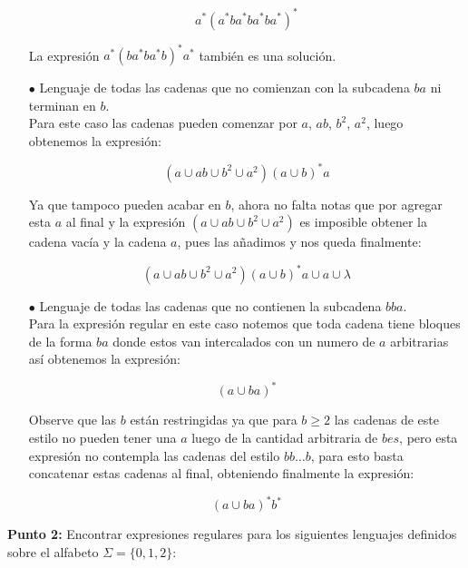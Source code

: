 \begin{itemize}
    $$a^*(a^*ba^*ba^*ba^*)^*$$

    La expresión $a^*(ba^*ba^*b)^*a^*$ también es una solución.

    \item[$\bullet$] Lenguaje de todas las cadenas que no comienzan con la subcadena $ba$ ni terminan en $b.$\\ 

    Para este caso las cadenas pueden comenzar por $a$, $ab$, $b^2$, $a^2$, luego obtenemos la expresión:

    $$(a\cup ab \cup b^2 \cup a^2)(a \cup b)^*a $$

    Ya que tampoco pueden acabar en $b$, ahora no falta notas que por agregar esta $a$ al final y la expresión $(a\cup ab \cup b^2 \cup a^2)$ es imposible obtener la cadena vacía y la cadena $a$, pues las añadimos y nos queda finalmente:

     $$(a\cup ab \cup b^2 \cup a^2)(a \cup b)^*a \cup a \cup \lambda$$

     \item[$\bullet$] Lenguaje de todas las cadenas que no contienen la subcadena $bba.$\\ 

     Para la expresión regular en este caso notemos que toda cadena tiene bloques de la forma $ba$ donde estos van intercalados con un numero de $a$ arbitrarias así obtenemos la expresión:

     $$(a\cup ba)^*$$

     Observe que las $b$ están restringidas ya que para $b\geq 2$ las cadenas de este estilo no pueden tener una $a$ luego de la cantidad arbitraria de $bes$, pero esta expresión no contempla las cadenas del estilo $bb\dots b$, para esto basta concatenar estas cadenas al final, obteniendo finalmente la expresión:

     $$(a\cup ba)^*b^*$$

\end{itemize}

\textbf{Punto 2: } Encontrar expresiones regulares para los siguientes lenguajes definidos sobre el alfabeto $\Sigma=\{0,1,2\}:$

